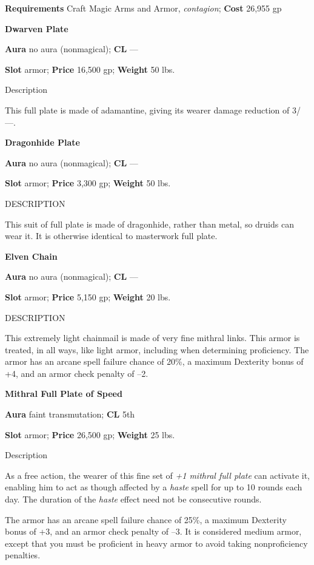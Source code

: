 \textbf{Requirements} Craft Magic Arms and Armor, \textit{contagion}; \textbf{Cost }26,955 gp
				
\textbf{Dwarven Plate}
				
\textbf{Aura} no aura (nonmagical); \textbf{CL} ---
				
\textbf{Slot} armor; \textbf{Price} 16,500 gp; \textbf{Weight }50 lbs.
				
Description
				
This full plate is made of adamantine, giving its wearer damage reduction of 3/---. 
				
\textbf{Dragonhide Plate}
				
\textbf{Aura} no aura (nonmagical); \textbf{CL} ---
				
\textbf{Slot} armor; \textbf{Price} 3,300 gp; \textbf{Weight} 50 lbs.
				
DESCRIPTION
				
This suit of full plate is made of dragonhide, rather than metal, so druids can wear it. It is otherwise identical to masterwork full plate. 
				
\textbf{Elven Chain}
				
\textbf{Aura} no aura (nonmagical); \textbf{CL} ---
				
\textbf{Slot} armor; \textbf{Price} 5,150 gp; \textbf{Weight} 20 lbs.
				
DESCRIPTION
				
This extremely light chainmail is made of very fine mithral links. This armor is treated, in all ways, like light armor, including when determining proficiency. The armor has an arcane spell failure chance of 20\%, a maximum Dexterity bonus of +4, and an armor check penalty of --2. 
				
\textbf{Mithral Full Plate of Speed}
				
\textbf{Aura} faint transmutation; \textbf{CL} 5th
				
\textbf{Slot} armor; \textbf{Price} 26,500 gp; \textbf{Weight }25 lbs.
				
Description
				
As a free action, the wearer of this fine set of \textit{+1 mithral full plate} can activate it, enabling him to act as though affected by a \textit{haste} spell for up to 10 rounds each day. The duration of the \textit{haste} effect need not be consecutive rounds.
				
The armor has an arcane spell failure chance of 25\%, a maximum Dexterity bonus of +3, and an armor check penalty of --3. It is considered medium armor, except that you must be proficient in heavy armor to avoid taking nonproficiency penalties. 
				
